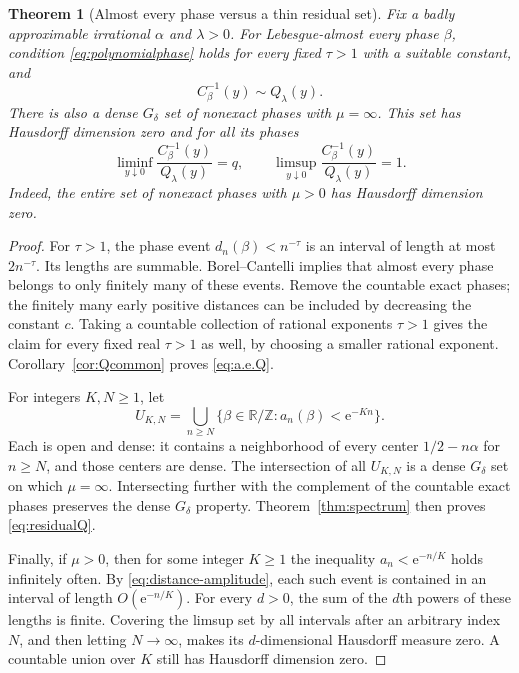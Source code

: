 \documentclass[11pt,a4paper]{article}
\newtheorem{theorem}{Theorem}[section]
\theoremstyle{definition}
\theoremstyle{remark}\newtheorem{remark}[theorem]{Remark}
\newcommand{\T}{\mathbb R/\mathbb Z}
\newcommand{\e}{\mathrm e}
\begin{document}
\begin{theorem}[Almost every phase versus a thin residual set]
\label{thm:category}
Fix a badly approximable irrational $\alpha$ and $\lambda>0$.
For Lebesgue-almost every phase $\beta$, condition
\eqref{eq:polynomialphase} holds for every fixed $\tau>1$ with a suitable
constant, and
\begin{equation}
 C_\beta^{-1}(y)\sim Q_\lambda(y).
 \label{eq:a.e.Q}
\end{equation}
There is also a dense $G_\delta$ set of nonexact phases with $\mu=\infty$.
This set has Hausdorff dimension zero and for all its phases
\begin{equation}
 \liminf_{y\downarrow0}\frac{C_\beta^{-1}(y)}{Q_\lambda(y)}=q,
 \qquad
 \limsup_{y\downarrow0}\frac{C_\beta^{-1}(y)}{Q_\lambda(y)}=1.
 \label{eq:residualQ}
\end{equation}
Indeed, the entire set of nonexact phases with $\mu>0$ has Hausdorff
dimension zero.
\end{theorem}
\begin{proof}
For $\tau>1$, the phase event $d_n(\beta)<n^{-\tau}$ is an interval of length
at most $2n^{-\tau}$.  Its lengths are summable.  Borel--Cantelli implies
that almost every phase belongs to only finitely many of these events.
Remove the countable exact phases; the finitely many early positive
distances can be included by decreasing the constant $c$.
Taking a countable collection of rational exponents $\tau>1$ gives the
claim for every fixed real $\tau>1$ as well, by choosing a smaller rational
exponent.  Corollary~\ref{cor:Qcommon} proves \eqref{eq:a.e.Q}.

For integers $K,N\ge1$, let
\[
 U_{K,N}=\bigcup_{n\ge N}\{\beta\in\T:a_n(\beta)<\e^{-Kn}\}.
\]
Each is open and dense: it contains a neighborhood of every center
$1/2-n\alpha$ for $n\ge N$, and those centers are dense.
The intersection of all $U_{K,N}$ is a dense $G_\delta$ set on which
$\mu=\infty$.  Intersecting further with the complement of the countable
exact phases preserves the dense $G_\delta$ property.
Theorem~\ref{thm:spectrum} then proves \eqref{eq:residualQ}.

Finally, if $\mu>0$, then for some integer $K\ge1$ the inequality
$a_n<\e^{-n/K}$ holds infinitely often.  By
\eqref{eq:distance-amplitude}, each such event is contained in an interval
of length $O(\e^{-n/K})$.  For every $d>0$, the sum of the $d$th powers of
these lengths is finite.  Covering the limsup set by all intervals after
an arbitrary index $N$, and then letting $N\to\infty$, makes its
$d$-dimensional Hausdorff measure zero.  A countable union over $K$ still
has Hausdorff dimension zero.
\end{proof}
\end{document}
